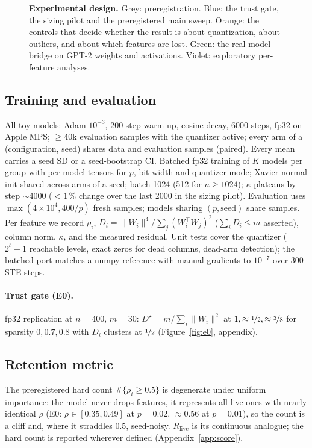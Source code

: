 \documentclass{article}
\begin{document}
\begin{figure}[t]
\begin{tikzpicture}
\end{tikzpicture}
\caption{\textbf{Experimental design.} Grey: preregistration. Blue: the trust gate, the sizing pilot and the preregistered
main sweep. Orange: the controls that decide whether the result is about quantization, about outliers, and about which
features are lost. Green: the real-model bridge on GPT-2 weights and activations. Violet: exploratory per-feature analyses.}
\label{fig:design}
\end{figure}

\subsection{Training and evaluation}
All toy models: Adam $10^{-3}$, 200-step warm-up, cosine decay, 6000 steps, fp32 on Apple MPS; $\ge$40k evaluation
samples with the quantizer active; every arm of a (configuration, seed) shares data and evaluation samples (paired).
Every mean carries a seed SD or a seed-bootstrap CI. Batched fp32 training of $K$ models per group with per-model tensors for $p$,
bit-width and quantizer mode; Xavier-normal init shared across arms of a seed; batch 1024 (512 for $n\ge1024$); $\kappa$ plateaus by
step $\sim$4000 ($<1\,\%$ change over the last 2000 in the sizing pilot). Evaluation uses $\max(4\times10^4, 400/p)$ fresh samples; models sharing
$(p,\text{seed})$ share samples. Per feature we record $\rho_i$, $D_i = \lVert W_i\rVert^4/\sum_j(W_i^\top W_j)^2$
($\sum_iD_i\le m$ asserted), column norm, $\kappa$, and the measured residual. Unit tests cover the quantizer ($2^b-1$
reachable levels, exact zeros for dead columns, dead-arm detection); the batched port matches a numpy reference with
manual gradients to $10^{-7}$ over 300 STE steps.

\paragraph{Trust gate (E0).} fp32 replication at $n=400$, $m=30$: $D^\star = m/\sum_i\lVert W_i\rVert^2$ at $1,\approx\nicefrac12,\approx\nicefrac38$
for sparsity $0,0.7,0.8$ with $D_i$ clusters at $\nicefrac12$ (Figure~\ref{fig:e0}, appendix).

\subsection{Retention metric}
The preregistered hard count $\#\{\rho_i\ge0.5\}$ is degenerate under uniform importance:
the model never drops features, it represents all live ones with nearly identical $\rho$ (E0: $\rho\in[0.35,0.49]$ at
$p=0.02$, $\approx0.56$ at $p=0.01$), so the count is a cliff and, where it straddles $0.5$, seed-noisy. $R_{\mathrm{live}}$
is its continuous analogue; the hard count is reported wherever defined (Appendix~\ref{app:score}).
\end{document}
